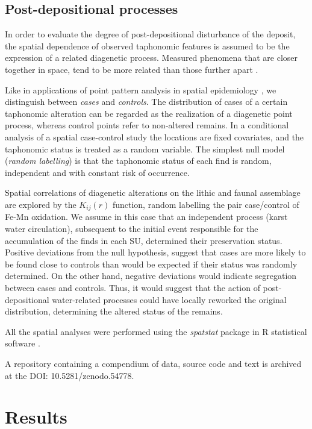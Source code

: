 \documentclass[review,authoryear]{elsarticle} %
\begin{document}
\subsection{Post-depositional processes}

In order to evaluate the degree of post-depositional disturbance of the deposit, the spatial dependence of observed taphonomic features is assumed to be the expression of a related diagenetic process. Measured phenomena that are closer together in space, tend to be more related than those further apart \citep{Tobler1970}.

Like in applications of point pattern analysis in spatial epidemiology \citep{Diggle2003,Gatrell1996}, we distinguish between \emph{cases} and \emph{controls}. The distribution of cases of a certain taphonomic alteration can be regarded as the realization of a diagenetic point process, whereas control points refer to non-altered remains. In a conditional analysis of a spatial case-control study the locations are fixed covariates, and the taphonomic status is treated as a random variable. The simplest null model (\emph{random labelling}) is that the taphonomic status of each find is random, independent and with constant risk of occurrence.

Spatial correlations of diagenetic alterations on the lithic and faunal assemblage are explored by the $K_{ij}(r)$ function, random labelling the pair case/control of Fe-Mn oxidation. We assume in this case that an independent process (karst water circulation), subsequent to the initial event responsible for the accumulation of the finds in each SU, determined their preservation status. Positive deviations from the null hypothesis, suggest that cases are more likely to be found close to controls than would be expected if their status was randomly determined. On the other hand, negative deviations would indicate segregation between cases and controls. Thus, it would suggest that the action of post-depositional water-related processes could have locally reworked the original distribution, determining the altered status of the remains.

All the spatial analyses were performed using the \emph{spatstat} package \citep{Baddeley2015} in \textsf{R} statistical software \citep{RCoreTeam2015}.

A repository containing a compendium of data, source code and text is archived at the DOI: 10.5281/zenodo.54778.

\section{Results}
\end{document}

